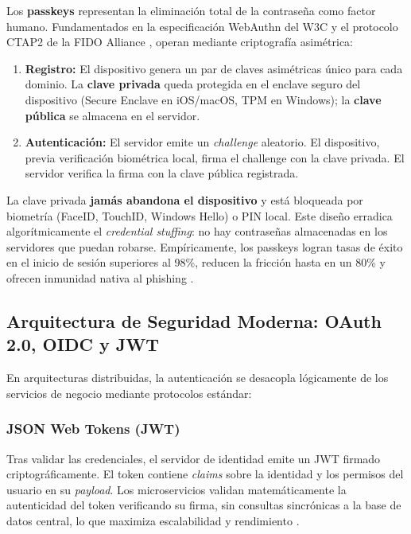 \documentclass[12pt, a4paper]{article}
\begin{document}
Los \textbf{passkeys} representan la eliminación total de la contraseña como factor
humano. Fundamentados en la especificación WebAuthn del W3C y el protocolo CTAP2
de la FIDO Alliance \cite{mojoauth2025}, operan mediante criptografía asimétrica:

\begin{enumerate}[noitemsep]
  \item \textbf{Registro:} El dispositivo genera un par de claves asimétricas
        único para cada dominio. La \textbf{clave privada} queda protegida en el
        enclave seguro del dispositivo (Secure Enclave en iOS/macOS, TPM en
        Windows); la \textbf{clave pública} se almacena en el servidor.
  \item \textbf{Autenticación:} El servidor emite un \textit{challenge} aleatorio.
        El dispositivo, previa verificación biométrica local, firma el challenge
        con la clave privada. El servidor verifica la firma con la clave pública
        registrada.
\end{enumerate}

\noindent La clave privada \textbf{jamás abandona el dispositivo} y está
bloqueada por biometría (FaceID, TouchID, Windows Hello) o PIN local. Este diseño
erradica algorítmicamente el \textit{credential stuffing}: no hay contraseñas
almacenadas en los servidores que puedan robarse. Empíricamente, los passkeys
logran tasas de éxito en el inicio de sesión superiores al 98\%, reducen la
fricción hasta en un 80\% y ofrecen inmunidad nativa al phishing
\cite{mojoauth2025,authsignal2025}.

\subsection{Arquitectura de Seguridad Moderna: OAuth 2.0, OIDC y JWT}
\label{sec:oauth}

En arquitecturas distribuidas, la autenticación se desacopla lógicamente de los
servicios de negocio mediante protocolos estándar:

\subsubsection{JSON Web Tokens (JWT)}

Tras validar las credenciales, el servidor de identidad emite un JWT firmado
criptográficamente. El token contiene \textit{claims} sobre la identidad y los
permisos del usuario en su \textit{payload}. Los microservicios validan
matemáticamente la autenticidad del token verificando su firma, sin consultas
sincrónicas a la base de datos central, lo que maximiza escalabilidad y
rendimiento \cite{frontegg2025}.
\end{document}
